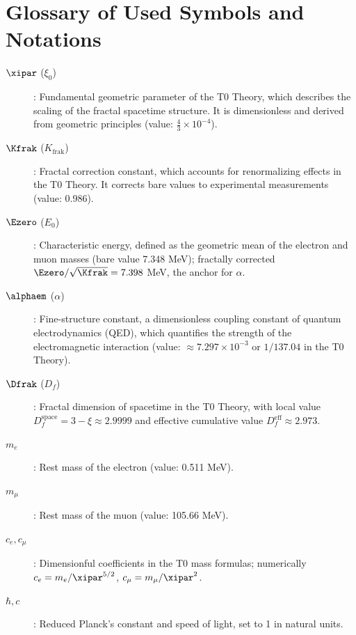 	\section{Glossary of Used Symbols and Notations}
	\begin{description}
		\item[$\xipar$ ($\xi_0$)]: Fundamental geometric parameter of the T0 Theory, which describes the scaling of the fractal spacetime structure. It is dimensionless and derived from geometric principles (value: $\frac{4}{3} \times 10^{-4}$).
		\item[$\Kfrak$ ($K_{\text{frak}}$)]: Fractal correction constant, which accounts for renormalizing effects in the T0 Theory. It corrects bare values to experimental measurements (value: 0.986).
		\item[$\Ezero$ ($E_0$)]: Characteristic energy, defined as the geometric mean of the electron and muon masses (bare value 7.348 MeV); fractally corrected $\Ezero/\sqrt{\Kfrak} = 7.398$ MeV, the anchor for $\alpha$.
		\item[$\alphaem$ ($\alpha$)]: Fine-structure constant, a dimensionless coupling constant of quantum electrodynamics (QED), which quantifies the strength of the electromagnetic interaction (value: $\approx 7.297 \times 10^{-3}$ or $1/137.04$ in the T0 Theory).
		\item[$\Dfrak$ ($D_f$)]: Fractal dimension of spacetime in the T0 Theory, with local value $D_f^{\text{space}} = 3 - \xi \approx 2.9999$ and effective cumulative value $D_f^{\text{eff}} \approx 2.973$.
		\item[$m_e$]: Rest mass of the electron (value: 0.511 MeV).
		\item[$m_\mu$]: Rest mass of the muon (value: 105.66 MeV).
		\item[$c_e, c_\mu$]: Dimensionful coefficients in the T0 mass formulas; numerically $c_e = m_e/\xipar^{5/2}$, $c_\mu = m_\mu/\xipar^2$.
		\item[$\hbar, c$]: Reduced Planck's constant and speed of light, set to 1 in natural units.
	\end{description}
